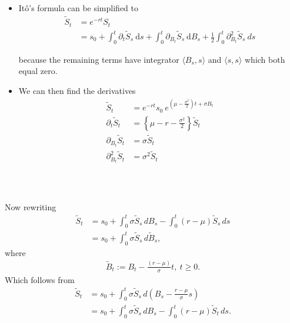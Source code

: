 \documentclass{beamer}
\numberwithin{equation}{section}
\newenvironment{frame2}{\begin{frame}\frametitle{{\normalsize \secname} \\ {\large \subsecname}}}{\end{frame}}
\begin{document}
\begin{frame2}
    \begin{itemize}
        \item Itô's formula can be simplified to
        \begin{align*}
            \tilde{S}_t &= e^{-rt}S_t\\
            &= s_0+\int_0^t\partial_{t}\tilde{S}_s\ \text{d}s + \int_0^t\partial_{B_t}\tilde{S}_s\ \text{d}B_s + \frac{1}{2}\int_0^t\partial_{B_t}^2 \tilde{S}_s \ d s
        \end{align*}

        \begingroup
        \footnotesize
        \color{gray}
        because the remaining terms have integrator $\langle B_s, s \rangle$ and $\langle s,s \rangle$ which both equal zero.
        \endgroup

        \item We can then find the derivatives
        \begin{align*}
            \tilde{S}_t &=e^{-rt}s_0 \ e^{(\mu-\frac{\sigma^2}{2})t+\sigma B_t} \\
            \partial_t \tilde{S}_t &= \left\{ \mu - r -  \frac{\sigma^2}{2}\right\}\tilde{S}_t \\
            \partial_{B_t} \tilde{S}_t &= \sigma \tilde{S}_t \\
            \partial^2_{B_t} \tilde{S}_t &= \sigma^2 \tilde{S}_t
        \end{align*}
    \end{itemize}
\end{frame2}

\begin{frame2}
    Now rewriting
    \begin{align}
        \tilde{S}_t &= s_0 + \int_0^t \sigma \tilde{S}_s\, dB_s - \int_0^t (r - \mu)\tilde{S}_s\, ds \\
        &= s_0 + \int_0^t \sigma \tilde{S}_s \, d \tilde{B}_s,
    \end{align}
    where
    \begin{align}
        \tilde{B}_t := B_t - \frac{(r - \mu)}{\sigma}t, \ t \geq 0.
    \end{align}
    Which follows from
    \begin{align}
        \tilde{S}_t &= s_0 + \int_0^t \sigma \tilde{S}_s \, d\left(B_s - \frac{r - \mu}{\sigma}s\right) \\
        &= s_0 + \int_0^t \sigma \tilde{S}_s \, dB_s - \int_0^t (r - \mu)\tilde{S}_t \, ds.
    \end{align}
\end{frame2}
\end{document}

